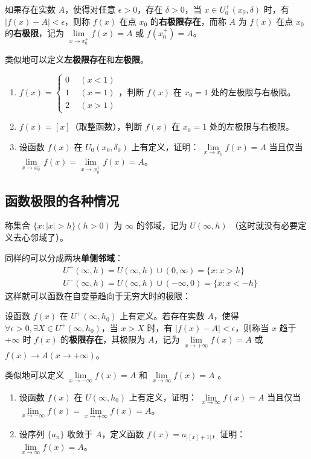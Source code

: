  如果存在实数 $A$，使得对任意 $\epsilon >0$，存在 $\delta>0$，当 $x\in U_0^+(x_0,\delta)$ 时，有 $|f(x)-A|<\epsilon$，则称 $f(x)$ 在点 $x_0$ 的\textbf{右极限存在}，而称 $A$ 为 $f(x)$ 在点 $x_0$ 的\textbf{右极限}，记为 $\lim\limits_{x\rightarrow x_0^+}f(x)=A$ 或 $f(x_0^+)=A$。

  类似地可以定义\textbf{左极限存在}和\textbf{左极限}。

\begin{exercise}{}
\begin{enumerate}
\item $f(x)=\left\{\begin{aligned} 0\ \ &(x<1)\\ 1\ \ &(x= 1)\\2\ \ &(x>1) \end{aligned}\right.$，判断 $f(x)$ 在 $x_0=1$ 处的左极限与右极限。
\item  $f(x)=[x]$（取整函数），判断 $f(x)$ 在 $x_0=1$ 处的左极限与右极限。
\item  设函数 $f(x)$ 在 $U_0(x_0,\delta_0)$ 上有定义，证明： $\lim\limits_{x\rightarrow x_0} f(x)=A$ 当且仅当 $\lim\limits_{x\rightarrow x_0^-}f(x)=\lim\limits_{x\rightarrow x_0^+}f(x)=A$。
\end{enumerate}
\end{exercise}

\subsection{函数极限的各种情况}
称集合 $\{x:|x|>h\}(h>0)$ 为 $\infty$ 的邻域，记为 $U(\infty,h)$ （这时就没有必要定义去心邻域了）。

同样的可以分成两块\textbf{单侧邻域}：
\begin{equation}
\begin{aligned}
&U^+(\infty,h)=U(\infty,h)\cup (0,\infty)=\{x:x>h\}\\
&U^-(\infty,h)=U(\infty,h)\cup (-\infty,0)=\{x:x<-h\}
\end{aligned}
\end{equation}
  这样就可以函数在自变量趋向于无穷大时的极限：

  设函数 $f(x)$ 在 $U^+(\infty,h_0)$ 上有定义。若存在实数 $A$，使得 $\forall \epsilon >0, \exists X\in U^+(\infty,h_0)$，当 $x>X$ 时，有 $|f(x)-A|<\epsilon$，则称当 $x$ 趋于 $+\infty$ 时 $f(x)$ 的\textbf{极限存在}，其极限为 $A$，记为 $\lim\limits_{x\rightarrow +\infty}f(x)=A$ 或 $f(x)\rightarrow A(x\rightarrow +\infty)$。

  类似地可以定义 $\lim\limits_{x\rightarrow -\infty}f(x)=A$ 和 $\lim\limits_{x\rightarrow \infty}f(x)=A$ 。
\begin{exercise}{}
\begin{enumerate}
\item 设函数 $f(x)$ 在 $U(\infty,h_0)$ 上有定义，证明： $\lim\limits_{x\rightarrow \infty} f(x)=A$ 当且仅当 $\lim\limits_{x\rightarrow -\infty}f(x)=\lim\limits_{x\rightarrow +\infty}f(x)=A$。
\item 设序列 $\{a_n\}$ 收敛于 $A$，定义函数 $f(x)=a_{|[x]+1|}$，证明：$\lim\limits_{x\rightarrow \infty} f(x)=A$。
\end{enumerate}
\end{exercise}

